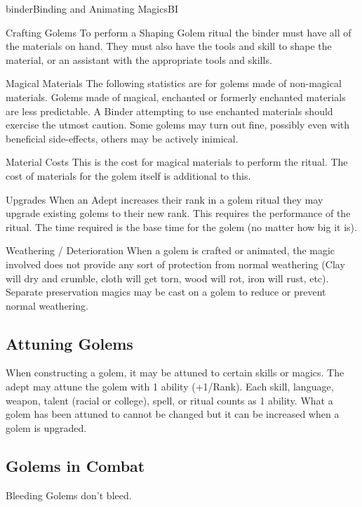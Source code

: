 \begin{college}[1.1]{binder}{Binding and Animating Magics}{BI}
\begin{Description}
\item[Crafting Golems] To perform a Shaping Golem ritual the binder
must have all of the materials on hand. They must also have the tools
and skill to shape the material, or an assistant with the appropriate
tools and skills.

\item[Magical Materials] The following statistics are for golems made
of non-magical materials. Golems made of magical, enchanted or
formerly enchanted materials are less predictable. A Binder attempting
to use enchanted materials should exercise the utmost caution. Some
golems may turn out fine, possibly even with beneficial side-effects,
others may be actively inimical.

\item[Material Costs] This is the cost for magical materials to perform
the ritual. The cost of materials for the golem itself is additional
to this.

\item[Upgrades] When an Adept increases their rank in a golem ritual
they may upgrade existing golems to their new rank. This requires the
performance of the ritual. The time required is the base time for the
golem (no matter how big it is).

\item[Weathering / Deterioration] When a golem is crafted or animated,
the magic involved does not provide any sort of protection from normal
weathering (\ie Clay will dry and crumble, cloth will get torn, wood
will rot, iron will rust, etc). Separate preservation magics may be
cast on a golem to reduce or prevent normal weathering.

\end{Description}

\subsection{Attuning Golems}

When constructing a golem, it may be attuned to certain skills or
magics. The adept may attune the golem with 1 ability (+1/Rank). Each
skill, language, weapon, talent (racial or college), spell, or ritual
counts as 1 ability. What a golem has been attuned to cannot be
changed but it can be increased when a golem is upgraded.

\subsection{Golems in Combat}
\begin{Description}
\item[Bleeding] Golems don't bleed.


\end{Description}
\end{college}
